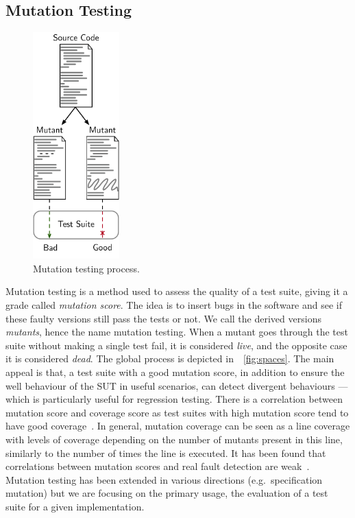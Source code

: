 \documentclass[a4paper,11pt]{sdm_internship}
\theoremstyle{definition}
\begin{document}
\subsection{Mutation Testing}%
\label{ssec:mutation_testing}
\begin{figure}
  \centering
  \includegraphics[width=9em]{mutation_testing_report}
  \caption{Mutation testing process.}%
\label{fig:mutation_testing}
\end{figure}
Mutation testing is a method used to assess the quality of a test suite, giving it a grade called \textit{mutation score}.
The idea is to insert bugs in the software and see if these faulty versions still pass the tests or not.
We call the derived versions \textit{mutants}, hence the name mutation testing.
When a mutant goes through the test suite without making a single test fail, it is considered \emph{live}, and the opposite case it is considered \emph{dead}.
The global process is depicted in~\figurename~\ref{fig:spaces}.
The main appeal is that, a test suite with a good mutation score, in addition to ensure the well behaviour of the SUT in useful scenarios, can detect divergent behaviours --- which is particularly useful for regression testing.
There is a correlation between mutation score and coverage score as test suites with high mutation score tend to have good coverage~\cite{assylbekov2013investigating}.
In general, mutation coverage can be seen as a line coverage with levels of coverage depending on the number of mutants present in this line, similarly to the number of times the line is executed.
It has been found that correlations between mutation scores and real fault detection are weak~\cite{papadakis2018mutation,just2014mutants}.
Mutation testing has been extended in various directions (e.g.\ specification mutation) but we are focusing on the primary usage, the evaluation of a test suite for a given implementation.
\end{document}
